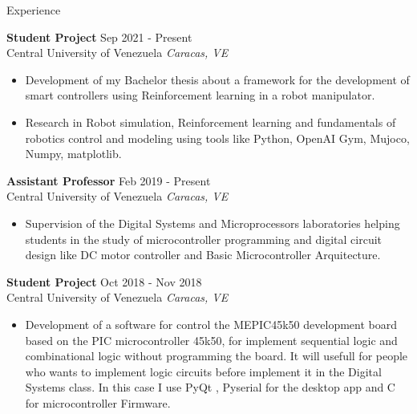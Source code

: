 \documentclass{resume} %
\begin{document}
\begin{rSection}{Experience} %

    \textbf{Student Project} \hfill Sep 2021 - Present\\
    Central University of Venezuela \hfill \textit{Caracas, VE}
    \begin{itemize}

        \item Development of my Bachelor thesis about a framework for the 
        development of smart controllers using Reinforcement learning in a robot 
        manipulator.

        \item Research in Robot simulation, Reinforcement learning and 
        fundamentals of robotics control and modeling using tools like 
        Python, OpenAI Gym, Mujoco, Numpy, matplotlib.

    \end{itemize}

    \textbf{Assistant Professor} \hfill Feb 2019 - Present\\
    Central University of Venezuela \hfill \textit{Caracas, VE}
    \begin{itemize}

        \item Supervision of the Digital Systems and Microprocessors 
        laboratories helping students in the study of microcontroller 
        programming and digital circuit design like DC motor controller and 
        Basic Microcontroller Arquitecture. 

    \end{itemize}

    \textbf{Student Project} \hfill Oct 2018 - Nov 2018\\
    Central University of Venezuela \hfill \textit{Caracas, VE}
    \begin{itemize}

        \item Development of a software for control the MEPIC45k50 development 
        board based on the PIC microcontroller 45k50, for implement sequential 
        logic and combinational logic without programming the board. It will 
        usefull for people who wants to implement logic circuits before 
        implement it in the Digital Systems class. In this case I use PyQt , 
        Pyserial for the desktop app and C for microcontroller Firmware. 

    \end{itemize}


\end{rSection}
\end{document}
